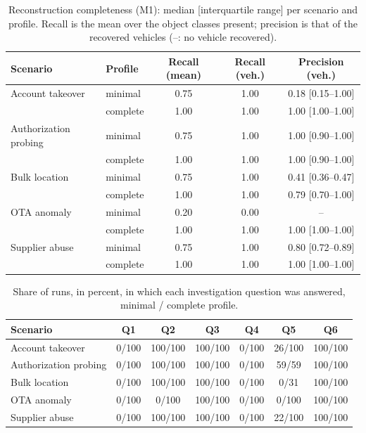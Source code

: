 \begin{table}[t]\centering\footnotesize
\caption{Reconstruction completeness (M1): median [interquartile range] per scenario and profile. Recall is the mean over the object classes present; precision is that of the recovered vehicles (--: no vehicle recovered).}
\label{tab:m1}
\begin{tabular}{@{}p{1.5in}lccc@{}}\toprule
Scenario & Profile & Recall (mean) & Recall (veh.) & Precision (veh.) \\\midrule
Account takeover & minimal & 0.75 & 1.00 & 0.18 [0.15--1.00] \\
 & complete & 1.00 & 1.00 & 1.00 [1.00--1.00] \\
Authorization probing & minimal & 0.75 & 1.00 & 1.00 [0.90--1.00] \\
 & complete & 1.00 & 1.00 & 1.00 [0.90--1.00] \\
Bulk location & minimal & 0.75 & 1.00 & 0.41 [0.36--0.47] \\
 & complete & 1.00 & 1.00 & 0.79 [0.70--1.00] \\
OTA anomaly & minimal & 0.20 & 0.00 & -- \\
 & complete & 1.00 & 1.00 & 1.00 [1.00--1.00] \\
Supplier abuse & minimal & 0.75 & 1.00 & 0.80 [0.72--0.89] \\
 & complete & 1.00 & 1.00 & 1.00 [1.00--1.00] \\
\bottomrule\end{tabular}\end{table}
\begin{table}[t]\centering\footnotesize
\caption{Share of runs, in percent, in which each investigation question was answered, minimal / complete profile.}
\label{tab:questions}
\begin{tabular}{@{}p{1.5in}cccccc@{}}\toprule
Scenario & Q1 & Q2 & Q3 & Q4 & Q5 & Q6 \\\midrule
Account takeover & 0/100 & 100/100 & 100/100 & 0/100 & 26/100 & 100/100 \\
Authorization probing & 0/100 & 100/100 & 100/100 & 0/100 & 59/59 & 100/100 \\
Bulk location & 0/100 & 100/100 & 100/100 & 0/100 & 0/31 & 100/100 \\
OTA anomaly & 0/100 & 0/100 & 100/100 & 0/100 & 0/100 & 100/100 \\
Supplier abuse & 0/100 & 100/100 & 100/100 & 0/100 & 22/100 & 100/100 \\
\bottomrule\end{tabular}\end{table}
